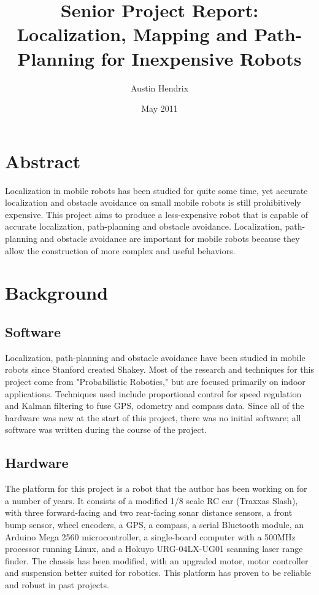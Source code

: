 \documentclass[a4paper,12pt]{article}
\begin{document}
\title{Senior Project Report: Localization, Mapping and Path-Planning for Inexpensive Robots}
\author{Austin Hendrix}
\date{May 2011}
\maketitle

\section{Abstract}
Localization in mobile robots has been studied for quite some time, yet accurate localization and obstacle avoidance on small mobile robots is still prohibitively expensive. This project aims to produce a less-expensive robot that is capable of accurate localization, path-planning and obstacle avoidance. Localization, path-planning and obstacle avoidance are important for mobile robots because they allow the construction of more complex and useful behaviors.


\section{Background}
\subsection{Software}
Localization, path-planning and obstacle avoidance have been studied in mobile robots since Stanford created Shakey\cite{shakey}. Most of the research and techniques for this project come from "Probabilistic Robotics,"\cite{thrun} but are focused primarily on indoor applications. Techniques used include proportional control for speed regulation and Kalman filtering to fuse GPS, odometry and compass data. Since all of the hardware was new at the start of this project, there was no initial software; all software was written during the course of the project.

\subsection{Hardware}
The platform for this project is a robot that the author has been working on for a number of years. It consists of a modified 1/8 scale RC car (Traxxas Slash\cite{traxxas}), with three forward-facing and two rear-facing sonar distance sensors, a front bump sensor, wheel encoders, a GPS, a compass, a serial Bluetooth module, an Arduino Mega 2560 microcontroller, a single-board computer with a 500MHz processor running Linux, and a Hokuyo URG-04LX-UG01 scanning laser range finder. The chassis has been modified, with an upgraded motor, motor controller and suspension better suited for robotics. This platform has proven to be reliable and robust in past projects.
\end{document}
